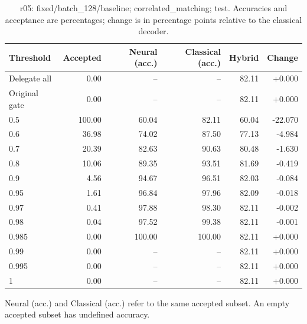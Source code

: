 \begin{table}[htbp]
\centering\small
\setlength{\tabcolsep}{3pt}
\caption{r05: fixed/batch\_128/baseline; correlated\_matching; test. Accuracies and acceptance are percentages; change is in percentage points relative to the classical decoder.}
\begin{tabular}{lrrrrr}
\toprule
Threshold & Accepted & Neural (acc.) & Classical (acc.) & Hybrid & Change \\
\midrule
Delegate all & 0.00 & -- & -- & 82.11 & +0.000 \\
Original gate & 0.00 & -- & -- & 82.11 & +0.000 \\
0.5 & 100.00 & 60.04 & 82.11 & 60.04 & -22.070 \\
0.6 & 36.98 & 74.02 & 87.50 & 77.13 & -4.984 \\
0.7 & 20.39 & 82.63 & 90.63 & 80.48 & -1.630 \\
0.8 & 10.06 & 89.35 & 93.51 & 81.69 & -0.419 \\
0.9 & 4.56 & 94.67 & 96.51 & 82.03 & -0.084 \\
0.95 & 1.61 & 96.84 & 97.96 & 82.09 & -0.018 \\
0.97 & 0.41 & 97.88 & 98.30 & 82.11 & -0.002 \\
0.98 & 0.04 & 97.52 & 99.38 & 82.11 & -0.001 \\
0.985 & 0.00 & 100.00 & 100.00 & 82.11 & +0.000 \\
0.99 & 0.00 & -- & -- & 82.11 & +0.000 \\
0.995 & 0.00 & -- & -- & 82.11 & +0.000 \\
1 & 0.00 & -- & -- & 82.11 & +0.000 \\
\bottomrule
\end{tabular}
\par\smallskip\footnotesize Neural (acc.) and Classical (acc.) refer to the same accepted subset. An empty accepted subset has undefined accuracy.
\end{table}

